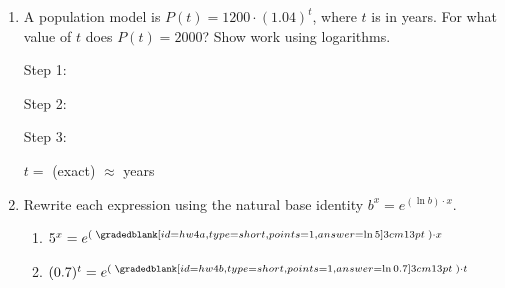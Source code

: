 \documentclass[10pt]{article}
\begin{document}
\begin{enumerate}[leftmargin=1.8em, itemsep=14pt]
\begin{enumerate}[leftmargin=1.5em, itemsep=10pt, label=\alph*.]
  \item $\log_3 x + \log_3(x-8) = 2$

  \vspace{4pt}
  Step 1 (combine): \writeline

  \vspace{4pt}
  Step 2 (exponential form): \writeline

  \vspace{4pt}
  Step 3 (solve quadratic): \writeline

  \vspace{4pt}
  Possible solutions: $x = $ \smash{\gradedblank[id=hw2b1, type=short, points=1, answer={9}]{2cm}{13pt}} or $x = $ \smash{\gradedblank[id=hw2b2, type=short, points=1, answer={-1}]{2cm}{13pt}}

  \vspace{4pt}
  Check for extraneous solutions: \writeline

  \vspace{4pt}
  Final answer: $x = $ \smash{\gradedblank[id=hw2b3, type=short, points=1, answer={9}]{2.5cm}{13pt}}
\end{enumerate}

\item A population model is $P(t) = 1200 \cdot (1.04)^t$, where $t$ is in years.
      For what value of $t$ does $P(t) = 2000$? Show work using logarithms.

\vspace{4pt}
Step 1: \writeline

\vspace{4pt}
Step 2: \writeline

\vspace{4pt}
Step 3: \writeline

\vspace{4pt}
$t = $ \smash{\gradedblank[id=hw3a, type=short, points=2, answer={\log(5/3)/\log(1.04)}]{5cm}{13pt}} (exact) $\approx $ \smash{\gradedblank[id=hw3b, type=short, check=numeric, tolerance=0.005, points=1, answer={13.02}]{2.5cm}{13pt}} years

\item Rewrite each expression using the natural base identity $b^x = e^{(\ln b)\cdot x}$.

\begin{enumerate}[leftmargin=1.5em, itemsep=6pt, label=\alph*.]
  \item $5^x = e^{(\;\smash{\gradedblank[id=hw4a, type=short, points=1, answer={\ln 5}]{3cm}{13pt}}\;)\cdot x}$

  \item $(0.7)^t = e^{(\;\smash{\gradedblank[id=hw4b, type=short, points=1, answer={\ln 0.7}]{3cm}{13pt}}\;)\cdot t}$
\end{enumerate}


\end{enumerate}
\end{document}
